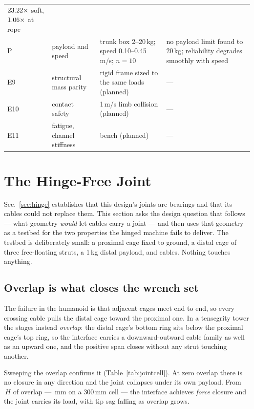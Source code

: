 \documentclass[conference]{IEEEtran}
\begin{document}
\begin{table}[tb]
\begin{tabular}{llp{4.6cm}p{5.6cm}}
$23.22\times$ soft, $1.06\times$ at rope\\
P & payload and speed & trunk box 2--20\,kg; speed 0.10--0.45\,m/s; $n=10$ &
no payload limit found to 20\,kg; reliability degrades smoothly with speed\\
\midrule
E9 & structural mass parity & rigid frame sized to the same loads (planned) &
---\\
E10 & contact safety & 1\,m/s limb collision (planned) & ---\\
E11 & fatigue, channel stiffness & bench (planned) & ---\\
\bottomrule
\end{tabular}
\end{table}

\section{The Hinge-Free Joint}
\label{sec:jointcell}
Sec.~\ref{sec:hinge} establishes that this design's joints are bearings and
that its cables could not replace them. This section asks the design question
that follows --- what geometry \emph{would} let cables carry a joint --- and
then uses that geometry as a testbed for the two properties the hinged machine
fails to deliver. The testbed is deliberately small: a proximal cage fixed to
ground, a distal cage of three free-floating struts, a 1\,kg distal payload,
and cables. Nothing touches anything.

\subsection{Overlap is what closes the wrench set}
The failure in the humanoid is that adjacent cages meet end to end, so every
crossing cable pulls the distal cage toward the proximal one. In a tensegrity
tower the stages instead \emph{overlap}: the distal cage's bottom ring sits
below the proximal cage's top ring, so the interface carries a downward-outward
cable family as well as an upward one, and the positive span closes without any
strut touching another.

Sweeping the overlap confirms it (Table~\ref{tab:jointcell}). At zero overlap
there is no closure in any direction and the joint collapses under its own
payload. From \jointOverlapFrac$\,H$ of overlap --- \jointOverlapMm\,mm on a
300\,mm cell --- the interface achieves \emph{force} closure and the joint
carries its load, with tip sag falling as overlap grows.
\end{document}
